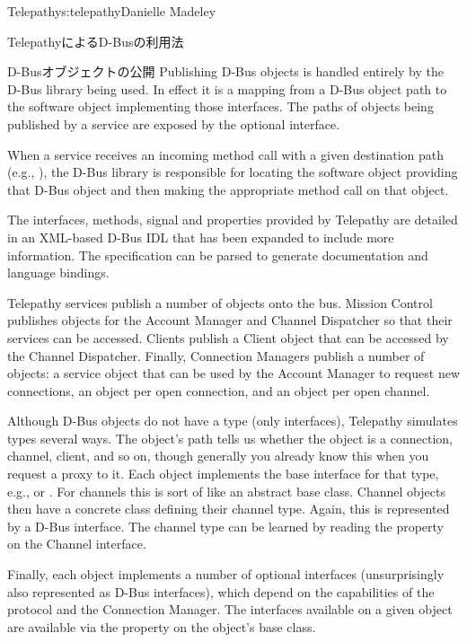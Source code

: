 \begin{aosachapter}{Telepathy}{s:telepathy}{Danielle Madeley}
\begin{aosasect1}{TelepathyによるD-Busの利用法}
\begin{aosabox}{D-Busオブジェクトの公開}
Publishing D-Bus objects is handled entirely by the D-Bus library
being used. In effect it is a mapping from a D-Bus object path to the
software object implementing those interfaces.  The paths of objects
being published by a service are exposed by the optional
 interface.

When a service receives an incoming method call with a given
destination path (e.g., ), the D-Bus
library is responsible for locating the software object providing that
D-Bus object and then making the appropriate method call on that
object.

\end{aosabox}

The interfaces, methods, signal and properties provided by Telepathy
are detailed in an XML-based D-Bus IDL that has been expanded to
include more information.  The specification can be parsed to generate
documentation and language bindings.

Telepathy services publish a number of objects onto the bus. Mission
Control publishes objects for the Account Manager and Channel
Dispatcher so that their services can be accessed. Clients publish a
Client object that can be accessed by the Channel Dispatcher. Finally,
Connection Managers publish a number of objects: a service object that
can be used by the Account Manager to request new connections, an
object per open connection, and an object per open channel.

Although D-Bus objects do not have a type (only interfaces), Telepathy
simulates types several ways. The object's path tells us whether the
object is a connection, channel, client, and so on, though generally
you already know this when you request a proxy to it. Each object
implements the base interface for that type, e.g.,
 or .  For channels this is
sort of like an abstract base class.  Channel objects then have a
concrete class defining their channel type.  Again, this is
represented by a D-Bus interface. The channel type can be learned by
reading the  property on the Channel interface.

Finally, each object implements a number of optional interfaces
(unsurprisingly also represented as D-Bus interfaces), which depend on
the capabilities of the protocol and the Connection Manager.  The
interfaces available on a given object are available via the
 property on the object's base class.


\end{aosasect1}
\end{aosachapter}
